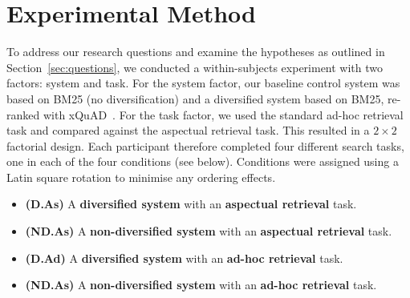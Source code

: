 \section{Experimental Method} \label{sec:method}
To address our research questions and examine the hypotheses as outlined in Section~\ref{sec:questions}, we conducted a within-subjects experiment with two factors: system and task. For the system factor, our baseline control system was based on BM25 (no diversification) and a diversified system based on BM25, re-ranked with xQuAD~\cite{santos2010query_reformulations_diversification}. For the task factor, we used the standard ad-hoc retrieval task and compared against the aspectual retrieval task. This resulted in a $2 \times 2$ factorial design. Each participant therefore completed four different search tasks, one in each of the four conditions (see below). Conditions were assigned using a Latin square rotation to minimise any ordering effects.


\begin{itemize}
\item \textbf{(D.As)} A \textbf{diversified system} with an \textbf{aspectual retrieval} task.
\item \textbf{(ND.As)} A \textbf{non-diversified system} with an \textbf{aspectual retrieval} task.
\item \textbf{(D.Ad)} A \textbf{diversified system} with an \textbf{ad-hoc retrieval} task. 
\item \textbf{(ND.As)} A \textbf{non-diversified system} with an \textbf{ad-hoc retrieval} task.
\end{itemize}


